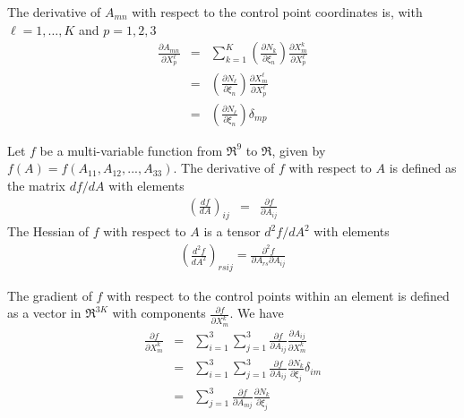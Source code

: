 \documentclass{report}
\begin{document}
\noindent The derivative of $A_{mn}$ with respect to the control point 
coordinates is, with $\ell=1,\ldots,K$ and $p=1,2,3$
\begin{eqnarray}
\frac{\partial A_{mn}}{\partial X_p^\ell} & = &  \sum_{k=1}^K \left( \frac{\partial N_k}{\partial \xi_n} \right) \frac{\partial X_m^k}{\partial X_p^\ell} \\
  & = &  \left( \frac{\partial N_\ell}{\partial \xi_n} \right) \frac{\partial X_m^\ell}{\partial X_p^\ell} \\
  & = &  \left( \frac{\partial N_\ell}{\partial \xi_n} \right) \delta_{m p}
\end{eqnarray}

 \newline
Let $f$ be a multi-variable function from $\Re^9$ to $\Re$, given by 
$f(A) = f(A_{11},A_{12},...,A_{33})$.  The derivative of $f$ with respect 
to $A$ is defined as the matrix $df/dA$ with elements
\begin{eqnarray}
\left( \frac{df}{dA} \right)_{ij} & = & \frac{\partial f}{\partial A_{ij}}
\end{eqnarray}
The Hessian of $f$ with respect to $A$ is a tensor $d^2 f/ dA^2$ with elements
\begin{eqnarray}
\left( \frac{d^2 f}{d A^2} \right)_{rsij} = \frac{\partial^2 f}{\partial A_{rs} \partial A_{ij}}
\end{eqnarray}

\newline The gradient of $f$ with respect to the control points within an
element is defined as a vector in $\Re^{3K}$ with components 
$\frac{\partial f}{\partial X_m^k}$. We have
\begin{eqnarray}
\frac{\partial f}{\partial X_m^k} & = & \sum_{i=1}^3 \sum_{j=1}^3 \frac{\partial f}{\partial A_{ij}} \frac{\partial A_{ij}}{\partial X_m^k} \\
& = & \sum_{i=1}^3 \sum_{j=1}^3 \frac{\partial f}{\partial A_{ij}} \frac{\partial N_k}{\partial \xi_j} \delta_{im} \\
 & = & \sum_{j=1}^3 \frac{\partial f}{\partial A_{mj}} \frac{\partial N_k}{\partial \xi_j}
\end{eqnarray}
\end{document}
